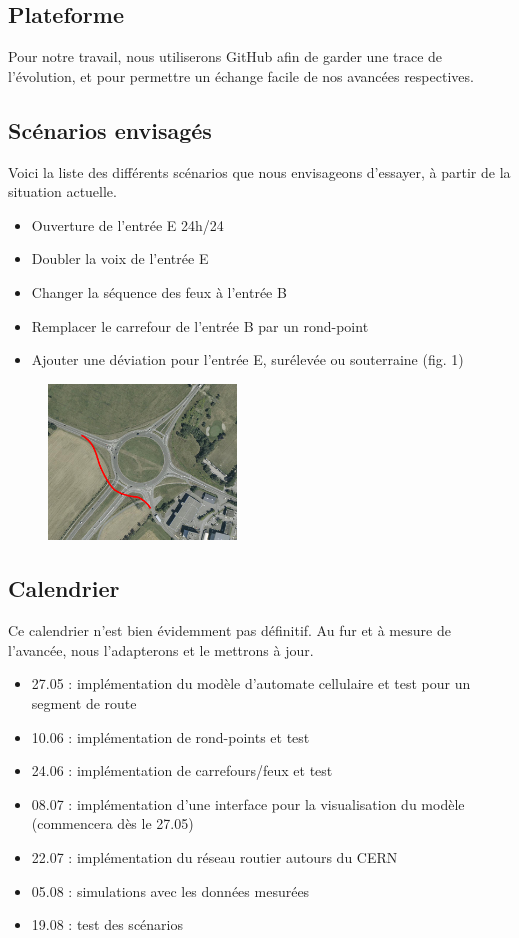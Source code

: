 \documentclass[a4paper,10pt]{extarticle}
\begin{document}
\subsection*{Plateforme}

Pour notre travail, nous utiliserons GitHub afin de garder une trace de l'évolution, et pour permettre un échange facile de nos avancées respectives.

\subsection*{Scénarios envisagés}

Voici la liste des différents scénarios que nous envisageons d'essayer, à partir de la situation actuelle.

\begin{itemize}
\item Ouverture de l'entrée E 24h/24
\item Doubler la voix de l'entrée E
\item Changer la séquence des feux à l'entrée B
\item Remplacer le carrefour de l'entrée B par un rond-point
\item Ajouter une déviation pour l'entrée E, surélevée ou souterraine (fig. 1)
\end{itemize}

\begin{figure}[h!]
\begin{center}
\includegraphics[width=5cm]{plan_E_scenario.png}
\end{center}
\end{figure}

\subsection*{Calendrier}

Ce calendrier n'est bien évidemment pas définitif. Au fur et à mesure de l'avancée, nous l'adapterons et le mettrons à jour.

\begin{itemize}
\item 27.05 : implémentation du modèle d'automate cellulaire et test pour un segment de route
\item 10.06 : implémentation de rond-points et test
\item 24.06 : implémentation de carrefours/feux et test
\item 08.07 : implémentation d'une interface pour la visualisation du modèle (commencera dès le 27.05)
\item 22.07 : implémentation du réseau routier autours du CERN
\item 05.08 : simulations avec les données mesurées
\item 19.08 : test des scénarios
\end{itemize}
\end{document}
